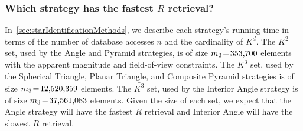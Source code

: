 \begin{table}
\end{table}

\subsubsection{Which strategy has the fastest $R$ retrieval?}
In~\autoref{sec:starIdentificationMethods}, we describe each strategy's running time in terms of the number of database
accesses $n$ and the cardinality of $K^d$.
The $K^2$ set, used by the Angle and Pyramid strategies, is of size $m_2 \!=\! 353{,}700$ elements with the apparent
magnitude and field-of-view constraints.
The $K^3$ set, used by the Spherical Triangle, Planar Triangle, and Composite Pyramid strategies is of size
$m_3 \!=\! 12{,}520{,}359$ elements.
The $\bar{K^3}$ set, used by the Interior Angle strategy is of size $\bar{m_3} \!=\! 37{,}561{,}083$ elements.
Given the size of each set, we expect that the Angle strategy will have the fastest $R$ retrieval and
Interior Angle will have the slowest $R$ retrieval.


